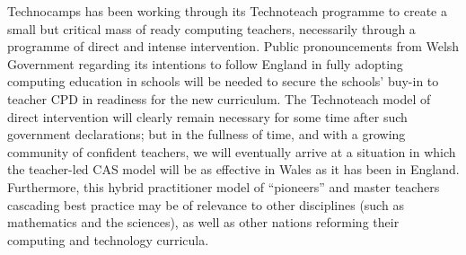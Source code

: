 \documentclass[conference]{IEEEtran}
\begin{document}
Technocamps has been working through its Technoteach programme to
create a small but critical mass of ready computing teachers,
necessarily through a programme of direct and intense intervention.
Public pronouncements from Welsh Government regarding its intentions
to follow England in fully adopting computing education in schools
will be needed to secure the schools' buy-in to teacher CPD in
readiness for the new curriculum.  The Technoteach model of direct
intervention will clearly remain necessary for some time after such
government declarations; but in the fullness of time, and with a
growing community of confident teachers, we will eventually arrive at
a situation in which the teacher-led CAS model will be as effective in
Wales as it has been in England. Furthermore, this hybrid practitioner
model of ``pioneers'' and master teachers cascading best practice may
be of relevance to other disciplines (such as mathematics and the
sciences), as well as other nations reforming their computing and
technology curricula.






\end{document}
